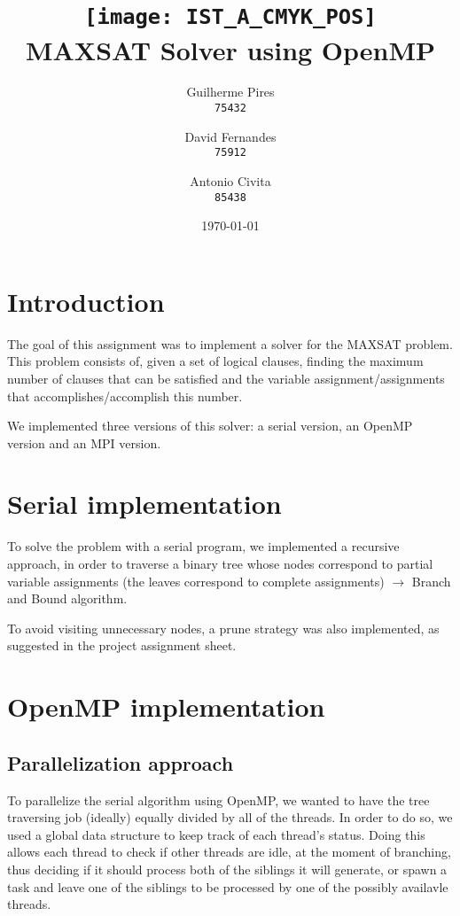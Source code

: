 \documentclass[paper=a4, fontsize=11pt]{scrartcl} %
\title{
	\texttt{[image: IST\_A\_CMYK\_POS]}\\
	MAXSAT Solver using OpenMP
}
\author{Guilherme Pires\\ \texttt{75432} \and
		David Fernandes\\ \texttt{75912} \and
		Antonio Civita\\ \texttt{85438}
} %
\date{\normalsize\today} %
\numberwithin{equation}{section} %
\numberwithin{figure}{section} %
\numberwithin{table}{section} %
\begin{document}
\maketitle %


\section{Introduction}

The goal of this assignment was to implement a solver for the MAXSAT problem. This problem consists of, given a set of logical
clauses, finding the maximum number of clauses that can be satisfied and the variable assignment/assignments that
accomplishes/accomplish this number.

We implemented three versions of this solver: a serial version, an OpenMP version and an MPI version.


\section{Serial implementation}

To solve the problem with a serial program, we implemented a recursive approach, in order to traverse a binary tree
whose nodes correspond to partial variable assignments (the leaves correspond to complete assignments) $ \to $
Branch and Bound algorithm.

To avoid visiting unnecessary nodes, a prune strategy was also implemented, as suggested in the project assignment sheet.

\section{OpenMP implementation}

\subsection{Parallelization approach}
To parallelize the serial algorithm using OpenMP, we wanted to have the tree traversing job (ideally) equally divided by all of
the threads.
In order to do so, we used a global data structure to keep track of each thread's status. Doing this allows each thread to check
if other threads are idle, at the moment of branching, thus deciding if it should process both of the siblings it will generate,
or spawn a task and leave one of the siblings to be processed by one of the possibly availavle threads.
\end{document}
